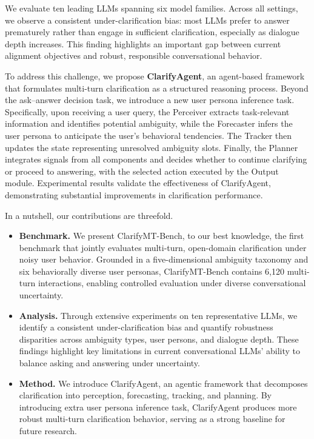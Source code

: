 \documentclass[sigconf]{acmart}
\newcommand{\dataset}{ClarifyMT-Bench\xspace}
\newcommand{\model}{ClarifyAgent\xspace}
\begin{document}
We evaluate ten leading LLMs spanning six model families. Across all settings, we observe a consistent under-clarification bias: most LLMs prefer to answer prematurely rather than engage in sufficient clarification, especially as dialogue depth increases. This finding highlights an important gap between current alignment objectives and robust, responsible conversational behavior.

To address this challenge, we propose \textbf{\model}, an agent-based framework that formulates multi-turn clarification as a structured reasoning process.
Beyond the ask–answer decision task, we introduce a new user persona inference task.
Specifically, upon receiving a user query, the Perceiver extracts task-relevant information and identifies potential ambiguity, while the Forecaster infers the user persona to anticipate the user’s behavioral tendencies.
The Tracker then updates the state representing unresolved ambiguity slots.
Finally, the Planner integrates signals from all components and decides whether to continue clarifying or proceed to answering, with the selected action executed by the Output module.
Experimental results validate the effectiveness of \model, demonstrating substantial improvements in clarification performance.


In a nutshell, our contributions are threefold.
\begin{itemize}[leftmargin=1.2em]

\item \textbf{Benchmark.} We present \dataset, 
to our best knowledge, the first benchmark that jointly evaluates multi-turn, open-domain clarification under noisy user behavior. 
Grounded in a five-dimensional ambiguity taxonomy and six behaviorally diverse user personas, 
\dataset{} contains 6{,}120 multi-turn interactions, enabling controlled evaluation under diverse conversational uncertainty.

\item \textbf{Analysis.} Through extensive experiments on ten representative LLMs, we identify a consistent under-clarification bias and quantify robustness disparities across ambiguity types, user persons, and dialogue depth. These findings highlight key limitations in current conversational LLMs’ ability to balance asking and answering under uncertainty.


\item \textbf{Method.} We introduce \model, an agentic framework that decomposes clarification into perception, forecasting, tracking, and planning. 
By introducing extra user persona inference task,
\model{} produces more robust multi-turn clarification behavior, serving as a strong baseline for future research.
\end{itemize}
\end{document}
